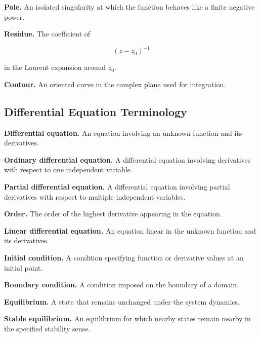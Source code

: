 \medskip

\textbf{Pole.}
An isolated singularity at which the function behaves like a finite negative
power.

\medskip

\textbf{Residue.}
The coefficient of

\[
\boxed{
(z-z_0)^{-1}
}
\]

in the Laurent expansion around \(z_0\).

\medskip

\textbf{Contour.}
An oriented curve in the complex plane used for integration.

\subsection{Differential Equation Terminology}
\label{subsec:differential-equation-terminology}

\textbf{Differential equation.}
An equation involving an unknown function and its derivatives.

\medskip

\textbf{Ordinary differential equation.}
A differential equation involving derivatives with respect to one
independent variable.

\medskip

\textbf{Partial differential equation.}
A differential equation involving partial derivatives with respect to
multiple independent variables.

\medskip

\textbf{Order.}
The order of the highest derivative appearing in the equation.

\medskip

\textbf{Linear differential equation.}
An equation linear in the unknown function and its derivatives.

\medskip

\textbf{Initial condition.}
A condition specifying function or derivative values at an initial point.

\medskip

\textbf{Boundary condition.}
A condition imposed on the boundary of a domain.

\medskip

\textbf{Equilibrium.}
A state that remains unchanged under the system dynamics.

\medskip

\textbf{Stable equilibrium.}
An equilibrium for which nearby states remain nearby in the specified
stability sense.


